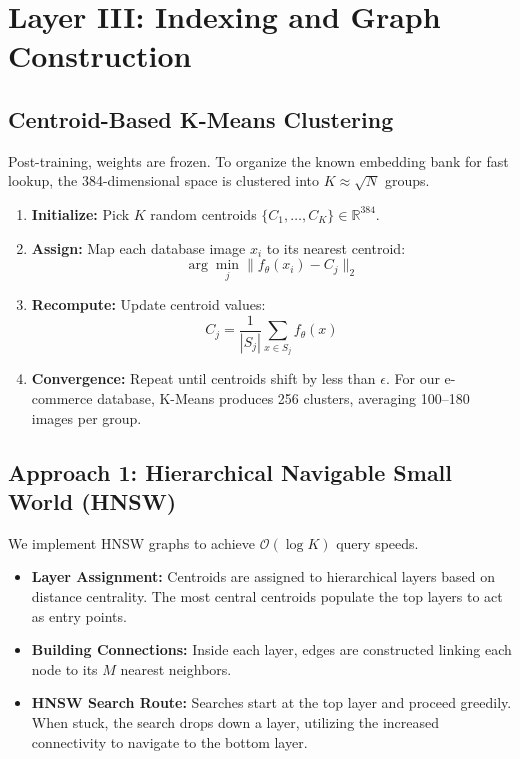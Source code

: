 \documentclass[11pt,a4paper]{article}
\begin{document}
\section{Layer III: Indexing and Graph Construction}

\subsection{Centroid-Based K-Means Clustering}
Post-training, weights are frozen. To organize the known embedding bank for fast lookup, the 384-dimensional space is clustered into $K \approx \sqrt{N}$ groups.
\begin{enumerate}
    \item \textbf{Initialize:} Pick $K$ random centroids $\{C_1, \dots, C_K\} \in \mathbb{R}^{384}$.
    \item \textbf{Assign:} Map each database image $x_i$ to its nearest centroid:
    \begin{equation}
        \arg\min_j \|f_{\theta}(x_i) - C_j\|_2
    \end{equation}
    \item \textbf{Recompute:} Update centroid values:
    \begin{equation}
        C_j = \frac{1}{|S_j|} \sum_{x \in S_j} f_{\theta}(x)
    \end{equation}
    \item \textbf{Convergence:} Repeat until centroids shift by less than $\epsilon$. For our e-commerce database, K-Means produces 256 clusters, averaging 100--180 images per group.
\end{enumerate}

\subsection{Approach 1: Hierarchical Navigable Small World (HNSW)}
We implement HNSW graphs to achieve $\mathcal{O}(\log K)$ query speeds.
\begin{itemize}
    \item \textbf{Layer Assignment:} Centroids are assigned to hierarchical layers based on distance centrality. The most central centroids populate the top layers to act as entry points.
    \item \textbf{Building Connections:} Inside each layer, edges are constructed linking each node to its $M$ nearest neighbors.
    \item \textbf{HNSW Search Route:} Searches start at the top layer and proceed greedily. When stuck, the search drops down a layer, utilizing the increased connectivity to navigate to the bottom layer.
\end{itemize}
\end{document}
